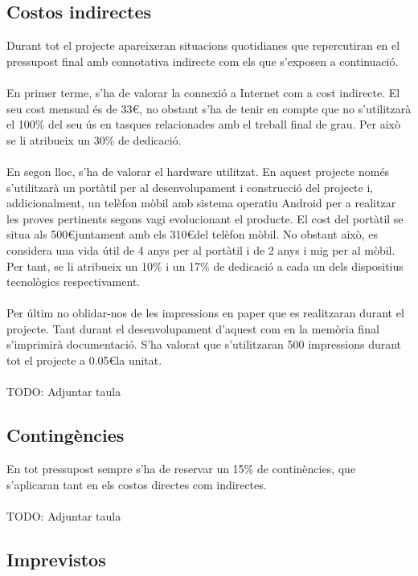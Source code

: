 \subsection{Costos indirectes}

Durant tot el projecte apareixeran situacions quotidianes que repercutiran en el pressupost final amb connotativa indirecte com els que s’exposen a continuació.
\\\\
En primer terme, s’ha de valorar la connexió a Internet com a cost indirecte. El seu cost mensual és de 33\euro, no obstant s’ha de tenir en compte que no s’utilitzarà el 100\% del seu ús en tasques relacionades amb el treball final de grau. Per això se li atribueix un 30\% de dedicació.
\\\\
En segon lloc, s’ha de valorar el hardware utilitzat. En aquest projecte només s’utilitzarà un portàtil per al desenvolupament i construcció del projecte i, addicionalment, un telèfon mòbil amb sistema operatiu Android per a realitzar les proves pertinents segons vagi evolucionant el producte. El cost del portàtil se situa als 500\euro\space juntament amb els 310\euro\space del telèfon mòbil. No obstant això, es considera una vida útil de 4 anys per al portàtil i de 2 anys i mig per al mòbil. Per tant, se li atribueix un 10\% i un 17\% de dedicació a cada un dels dispositius tecnològics respectivament.
\\\\
Per últim no oblidar-nos de les impressions en paper que es realitzaran durant el projecte. Tant durant el desenvolupament d’aquest com en la memòria final s’imprimirà documentació. S’ha valorat que s’utilitzaran 500 impressions durant tot el projecte a 0.05\euro\space la unitat.
\\\\
TODO: Adjuntar taula


\subsection{Contingències}

En tot pressupost sempre s’ha de reservar un 15\% de continències, que s’aplicaran tant en els costos directes com indirectes.
\\\\
TODO: Adjuntar taula

\subsection{Imprevistos}

